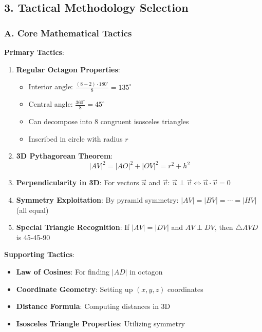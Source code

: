 \documentclass[12pt]{article}
\begin{document}
\begin{tacticalbox}
\subsection*{3. Tactical Methodology Selection}

\subsubsection*{A. Core Mathematical Tactics}

\textbf{Primary Tactics}:
\begin{enumerate}
    \item \textbf{Regular Octagon Properties}:
    \begin{itemize}
        \item Interior angle: $\frac{(8-2) \cdot 180^\circ}{8} = 135^\circ$
        \item Central angle: $\frac{360^\circ}{8} = 45^\circ$
        \item Can decompose into 8 congruent isosceles triangles
        \item Inscribed in circle with radius $r$
    \end{itemize}
    
    \item \textbf{3D Pythagorean Theorem}:
    $$|AV|^2 = |AO|^2 + |OV|^2 = r^2 + h^2$$
    
    \item \textbf{Perpendicularity in 3D}:
    For vectors $\vec{u}$ and $\vec{v}$: $\vec{u} \perp \vec{v} \Leftrightarrow \vec{u} \cdot \vec{v} = 0$
    
    \item \textbf{Symmetry Exploitation}:
    By pyramid symmetry: $|AV| = |BV| = \cdots = |HV|$ (all equal)
    
    \item \textbf{Special Triangle Recognition}:
    If $|AV| = |DV|$ and $AV \perp DV$, then $\triangle AVD$ is 45-45-90
\end{enumerate}

\textbf{Supporting Tactics}:
\begin{itemize}
    \item \textbf{Law of Cosines}: For finding $|AD|$ in octagon
    \item \textbf{Coordinate Geometry}: Setting up $(x, y, z)$ coordinates
    \item \textbf{Distance Formula}: Computing distances in 3D
    \item \textbf{Isosceles Triangle Properties}: Utilizing symmetry
\end{itemize}


\end{tacticalbox}
\end{document}
